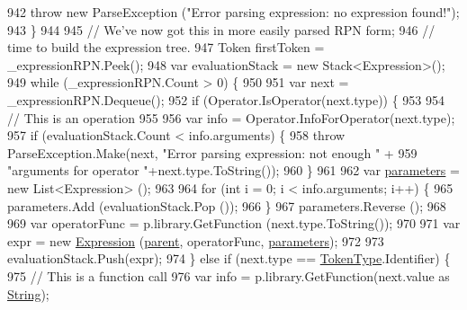 \begin{DoxyCode}
942                     \textcolor{keywordflow}{throw} \textcolor{keyword}{new} ParseException (\textcolor{stringliteral}{"Error parsing expression: no expression found!"});
943                 \}
944 
945                 \textcolor{comment}{// We've now got this in more easily parsed RPN form; }
946                 \textcolor{comment}{// time to build the expression tree.}
947                 Token firstToken = \_expressionRPN.Peek();
948                 var evaluationStack = \textcolor{keyword}{new} Stack<Expression>();
949                 \textcolor{keywordflow}{while} (\_expressionRPN.Count > 0) \{
950 
951                     var next = \_expressionRPN.Dequeue();
952                     \textcolor{keywordflow}{if} (Operator.IsOperator(next.type)) \{
953 
954                         \textcolor{comment}{// This is an operation}
955 
956                         var info = Operator.InfoForOperator(next.type);
957                         \textcolor{keywordflow}{if} (evaluationStack.Count < info.arguments) \{
958                             \textcolor{keywordflow}{throw} ParseException.Make(next, \textcolor{stringliteral}{"Error parsing expression: not enough "} +
959                                 \textcolor{stringliteral}{"arguments for operator "}+next.type.ToString());
960                         \}
961 
962                         var \hyperlink{a00054_a7b21380bead8ae08b2cfc6594edab32c}{parameters} = \textcolor{keyword}{new} List<Expression> ();
963 
964                         \textcolor{keywordflow}{for} (\textcolor{keywordtype}{int} i = 0; i < info.arguments; i++) \{
965                             parameters.Add (evaluationStack.Pop ());
966                         \}
967                         parameters.Reverse ();
968 
969                         var operatorFunc = p.library.GetFunction (next.type.ToString());
970 
971                         var expr = \textcolor{keyword}{new} \hyperlink{a00054_a91f0536300ebb39eaf9b7526c7e97364}{Expression} (\hyperlink{a00077_af313a82103fcc2ff5a177dbb06b92f7b}{parent}, operatorFunc, 
      \hyperlink{a00054_a7b21380bead8ae08b2cfc6594edab32c}{parameters});
972 
973                         evaluationStack.Push(expr);
974                     \} \textcolor{keywordflow}{else} \textcolor{keywordflow}{if} (next.type == \hyperlink{a00040_a301aa7c866593a5b625a8fc158bbeace}{TokenType}.Identifier) \{
975                         \textcolor{comment}{// This is a function call}
976                         var info = p.library.GetFunction(next.value as \hyperlink{a00040_a301aa7c866593a5b625a8fc158bbeacea27118326006d3829667a400ad23d5d98}{String});

\end{DoxyCode}
